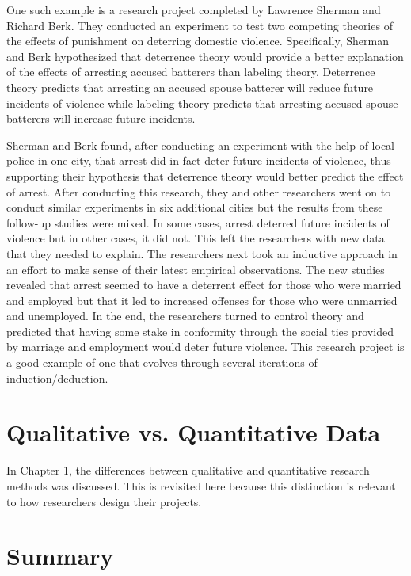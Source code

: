 One such example is a research project completed by Lawrence Sherman and Richard Berk\cite{sherman1984specific}. They conducted an experiment to test two competing theories of the effects of punishment on deterring domestic violence. Specifically, Sherman and Berk hypothesized that deterrence theory would provide a better explanation of the effects of arresting accused batterers than labeling theory. Deterrence theory predicts that arresting an accused spouse batterer will reduce future incidents of violence while labeling theory predicts that arresting accused spouse batterers will increase future incidents. 

Sherman and Berk found, after conducting an experiment with the help of local police in one city, that arrest did in fact deter future incidents of violence, thus supporting their hypothesis that deterrence theory would better predict the effect of arrest. After conducting this research, they and other researchers went on to conduct similar experiments in six additional cities but the results from these follow-up studies were mixed. In some cases, arrest deterred future incidents of violence but in other cases, it did not. This left the researchers with new data that they needed to explain. The researchers next took an inductive approach in an effort to make sense of their latest empirical observations. The new studies revealed that arrest seemed to have a deterrent effect for those who were married and employed but that it led to increased offenses for those who were unmarried and unemployed. In the end, the researchers turned to control theory and predicted that having some stake in conformity through the social ties provided by marriage and employment would deter future violence. This research project is a good example of one that evolves through several iterations of induction/deduction.

\section{Qualitative vs. Quantitative Data}

In Chapter 1, the differences between qualitative and quantitative research methods was discussed. This is revisited here because this distinction is relevant to how researchers design their projects.

\section{Summary}

